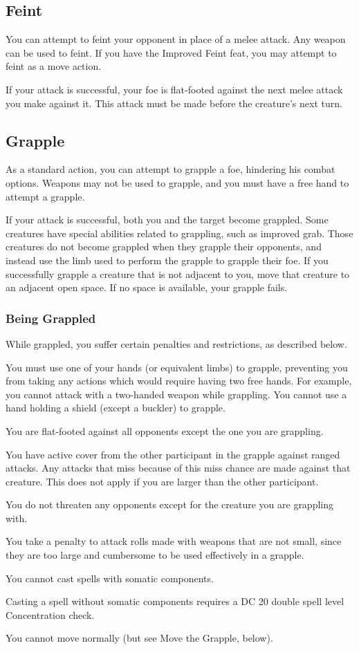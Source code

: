 \subsection{Feint}
You can attempt to feint your opponent in place of a melee attack. Any weapon can be used to feint. If you have the Improved Feint feat, you may attempt to feint as a move action.

If your attack is successful, your foe is flat-footed against the next melee attack you make against it. This attack must be made before the creature's next turn.

\subsection{Grapple}
As a standard action, you can attempt to grapple a foe, hindering his combat options. Weapons may not be used to grapple, and you must have a free hand to attempt a grapple.

\par If your attack is successful, both you and the target become grappled. Some creatures have special abilities related to grappling, such as improved grab. Those creatures do not become grappled when they grapple their opponents, and instead use the limb used to perform the grapple to grapple their foe. If you successfully grapple a creature that is not adjacent to you, move that creature to an adjacent open space. If no space is available, your grapple fails.

\subsubsection{Being Grappled}
While grappled, you suffer certain penalties and restrictions, as described below.
\begin{itemize*}
\item You must use one of your hands (or equivalent limbs) to grapple, preventing you from taking any actions which would require having two free hands. For example, you cannot attack with a two-handed weapon while grappling. You cannot use a hand holding a shield (except a buckler) to grapple.
\item You are flat-footed against all opponents except the one you are grappling.
\item You have active cover from the other participant in the grapple against ranged attacks. Any attacks that miss because of this miss chance are made against that creature. This does not apply if you are larger than the other participant.
\item You do not threaten any opponents except for the creature you are grappling with.
\item You take a  penalty to attack rolls made with weapons that are not small, since they are too large and cumbersome to be used effectively in a grapple.
\item You cannot cast spells with somatic components.
\item Casting a spell without somatic components requires a DC 20 \add double spell level Concentration check.
\item You cannot move normally (but see Move the Grapple, below).
\end{itemize*}

